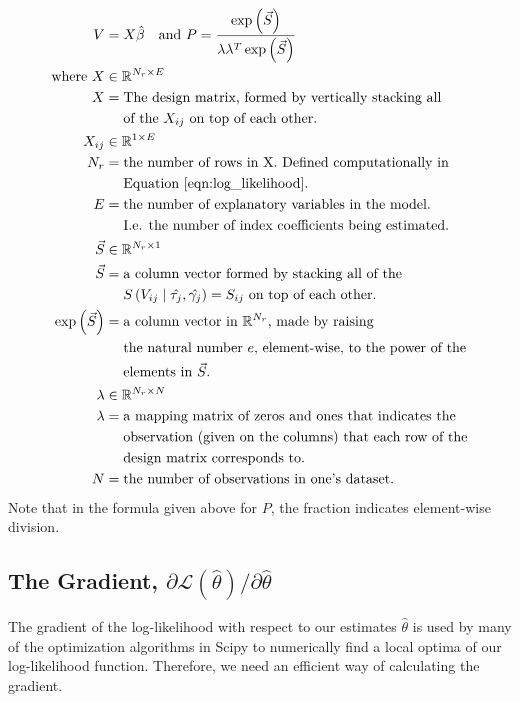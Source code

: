 \documentclass{article}
\begin{document}
\begin{equation}
\label{eqn:index_and_probs}
\begin{aligned}
V &= X \hat{\beta} \quad \textrm{and } P = \frac{\exp \left( \vec{S} \right)}{\lambda \lambda^T \exp \left( \vec{S} \right)}\\
\textrm{where }X &\in \mathbb{R}^{N_r \times E}\\
X &= \textrm{The design matrix, formed by vertically stacking all} \\
&\quad \ \textrm{of the $X_{ij}$ on top of each other.} \\
X_{ij} &\in \mathbb{R}^{1 \times E} \\
N_r &= \textrm{the number of rows in X. Defined computationally in} \\
&\quad \ \textrm{Equation \ref{eqn:log_likelihood}.} \\
E &= \textrm{the number of explanatory variables in the model.}\\
&\quad \ \textrm{I.e. the number of index coefficients being estimated.} \\
\vec{S} &\in \mathbb{R}^{N_r \times 1}\\
\vec{S} &= \textrm{a column vector formed by stacking all of the} \\
&\quad \ \textrm{$S \left( V_{ij} \mid \hat{\tau _j}, \hat{\gamma _j} \right) = S_{ij}$ on top of each other.}\\
\exp \left( \vec{S} \right) &= \textrm{a column vector in $\mathbb{R}^{N_r}$, made by raising} \\
&\quad \ \textrm{the natural number $e$, element-wise, to the power of the}\\
&\quad \ \textrm{elements in  $\vec{S}$.} \\
\lambda &\in \mathbb{R}^{N_r \times N} \\
\lambda &= \textrm{a mapping matrix of zeros and ones that indicates the} \\
&\quad \ \textrm{observation (given on the columns) that each row of the} \\
&\quad \ \textrm{design matrix corresponds to.} \\
N &= \textrm{the number of observations in one's dataset.}
\end{aligned}
\end{equation}
Note that in the formula given above for $P$, the fraction indicates element-wise division.

\subsection{The Gradient, ${\partial \mathcal{L} \left( \hat{\theta} \right)} / {\partial \hat{\theta}}$}
The gradient of the log-likelihood with respect to our estimates $\hat{\theta}$ is used by many of the optimization algorithms in Scipy to numerically find a local optima of our log-likelihood function. Therefore, we need an efficient way of calculating the gradient.
\end{document}
